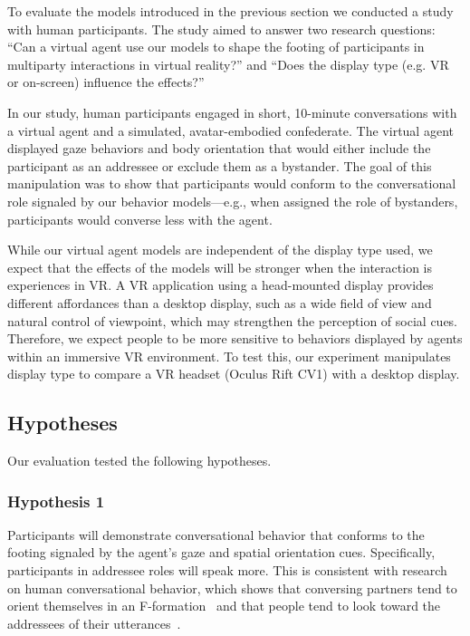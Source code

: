 To evaluate the models introduced in the previous section we conducted a study with human participants.
The study aimed to answer two research questions: ``Can a virtual agent use our  models to shape the footing of participants in multiparty interactions in virtual reality?'' and ``Does the display type (e.g. VR or on-screen) influence the effects?''

In our study, human participants engaged in short, 10-minute conversations with a virtual agent and a simulated, avatar-embodied confederate. The virtual agent displayed gaze behaviors and body orientation that would either include the participant as an addressee or exclude them as a bystander. The goal of this manipulation was to show that participants would conform to the conversational role signaled by our behavior models---e.g., when assigned the role of bystanders, participants would converse less with the agent.

While our virtual agent models are independent of the display type used, we expect that the effects of the models will be stronger when the interaction is experiences in VR. A VR application using a head-mounted display provides different affordances than a desktop display, such as a wide field of view and natural control of viewpoint, which may strengthen the perception of social cues. Therefore, we expect people to be more sensitive to behaviors displayed by agents within an immersive VR environment.
To test this, our experiment manipulates display type to compare a VR headset (Oculus Rift CV1) with a desktop display.

\subsection{Hypotheses}

Our evaluation tested the following hypotheses.

\subsubsection{Hypothesis 1}

Participants will demonstrate conversational behavior that conforms to the footing signaled by the agent's gaze and spatial orientation cues. Specifically, participants in addressee roles will speak more. This is consistent with research on human conversational behavior, which shows that conversing partners tend to orient themselves in an F-formation~\cite{kendon1990conducting} and that people tend to look toward the addressees of their utterances~\cite{kendon1967some}.

